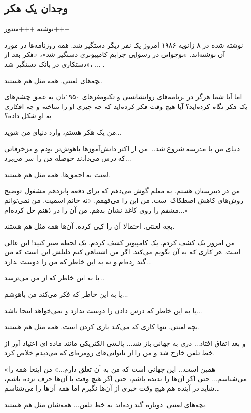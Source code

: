 \begin{mdframed}
\subsection*{وجدان یک هکر}

نوشته
+++منتور+++

نوشته شده در ۸ ژانویه 
۱۹۸۶
امروز یک نفر دیگر دستگیر شد. همه روزنامه‌ها در مورد آن نوشته‌اند. «نوجوانی در رسوایی جرایم کامپیوتری دستگیر شد»، «هکر بعد از دستکاری در بانک دستگیر شد»، ... .

بچه‌های لعنتی. همه مثل هم هستند.

اما آیا شما هرگز در برنامه‌های روانشانسی و تکنومغزهای ۱۹۵۰تان به عمق چشم‌های یک هکر نگاه کرده‌اید؟ آیا هیچ وقت فکر کرده‌اید که چه چیزی او را ساخته و چه افکاری به او شکل داده؟

من یک هکر هستم، وارد دنیای من شوید...

دنیای من با مدرسه شروع شد... من از اکثر دانش‌آموزها باهوش‌تر بودم و مزخرفاتی که درس می‌دادند حوصله من را سر می‌برد...

لعنت به احمق‌ها. همه مثل هم هستند.

من در دبیرستان هستم. به معلم گوش می‌دهم که برای دفعه پانزدهم مشغول توضیح روش‌های کاهش اصطکاک است. من این را می‌فهمم. «نه خانم اسمیت. من نمی‌توانم مشقم را روی کاغذ نشان بدهم. من آن را در ذهنم حل کرده‌ام...»

بچه لعنتی. احتمالا آن را کپی کرده. آن‌ها همه مثل هم هستند.

من امروز یک کشف کردم. یک کامپیوتر کشف کردم. یک لحظه صبر کنید! این عالی است. هر کاری که به آن بگویم می‌کند. اگر من اشتباهی کنم دلیلش این است که من گند زده‌ام و نه به این خاطر که من را دوست ندارد...

یا به این خاطر که از من می‌ترسد...

یا به این خاطر که فکر می‌کند من باهوشم...

یا به این خاطر که درس دادن را دوست ندارد و نمی‌خواهد اینجا باشد...

بچه لعنتی. تنها کاری که می‌کند بازی کردن است. همه مثل هم هستند.

و بعد اتفاق افتاد... دری به جهانی باز شد... پالسی الکتریکی مانند ماده ای اعتیاد آور از خط تلفن خارج شد و من را از ناتوانی‌های رومزه‌ای که می‌دیدم خلاص کرد.

«همین است... این جهانی است که من به آن تعلق دارم...» من اینجا همه را می‌شناسم... حتی اگر آن‌ها را ندیده باشم، حتی اگر هیچ وقت با آن‌ها حرف نزده باشم، شاید در آینده هم هیچ وقت خبری از آن‌ها نگیرم اما همه آن‌ها را می‌شناسم...

بچه‌های لعنتی. دوباره گند زده‌اند به خط تلفن... همه‌شان مثل هم هستند.


\end{mdframed}
